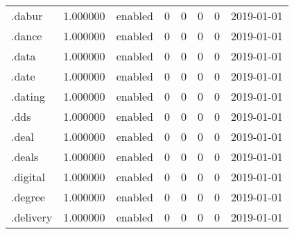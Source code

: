 \begin{tabular}{lrlrrrrl}
.dabur                    &          1.000000 &         enabled &                           0 &                           0 &                           0 &                   0 &           2019-01-01 \\
.dance                    &          1.000000 &         enabled &                           0 &                           0 &                           0 &                   0 &           2019-01-01 \\
.data                     &          1.000000 &         enabled &                           0 &                           0 &                           0 &                   0 &           2019-01-01 \\
.date                     &          1.000000 &         enabled &                           0 &                           0 &                           0 &                   0 &           2019-01-01 \\
.dating                   &          1.000000 &         enabled &                           0 &                           0 &                           0 &                   0 &           2019-01-01 \\
.dds                      &          1.000000 &         enabled &                           0 &                           0 &                           0 &                   0 &           2019-01-01 \\
.deal                     &          1.000000 &         enabled &                           0 &                           0 &                           0 &                   0 &           2019-01-01 \\
.deals                    &          1.000000 &         enabled &                           0 &                           0 &                           0 &                   0 &           2019-01-01 \\
.digital                  &          1.000000 &         enabled &                           0 &                           0 &                           0 &                   0 &           2019-01-01 \\
.degree                   &          1.000000 &         enabled &                           0 &                           0 &                           0 &                   0 &           2019-01-01 \\
.delivery                 &          1.000000 &         enabled &                           0 &                           0 &                           0 &                   0 &           2019-01-01 \\

\end{tabular}
